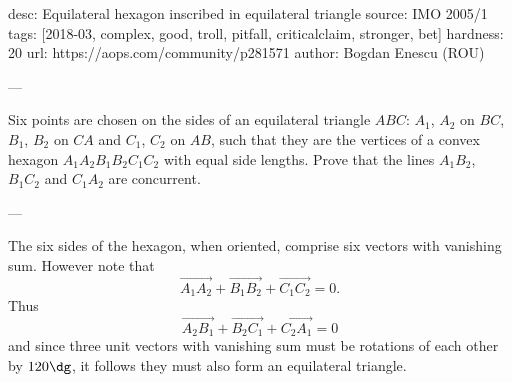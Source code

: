 desc: Equilateral hexagon inscribed in equilateral triangle
source: IMO 2005/1
tags: [2018-03, complex, good, troll, pitfall, criticalclaim, stronger, bet]
hardness: 20
url: https://aops.com/community/p281571
author: Bogdan Enescu (ROU)

---

Six points are chosen on the sides of an equilateral triangle $ABC$:
$A_1$, $A_2$ on $BC$, $B_1$, $B_2$ on $CA$ and $C_1$, $C_2$ on $AB$,
such that they are the vertices of a
convex hexagon $A_1A_2B_1B_2C_1C_2$ with equal side lengths.
Prove that the lines $A_1B_2$, $B_1C_2$ and $C_1A_2$ are concurrent.

---

The six sides of the hexagon, when oriented, comprise
six vectors with vanishing sum.
However note that \[ \overrightarrow{A_1A_2}
+ \overrightarrow{B_1B_2}
+ \overrightarrow{C_1C_2} = 0. \]
Thus
\[ \overrightarrow{A_2B_1} + \overrightarrow{B_2C_1} +
\overrightarrow{C_2A_1} = 0 \]
and since three unit vectors with vanishing sum
must be rotations of each other by $120\dg$,
it follows they must also form an equilateral triangle.

